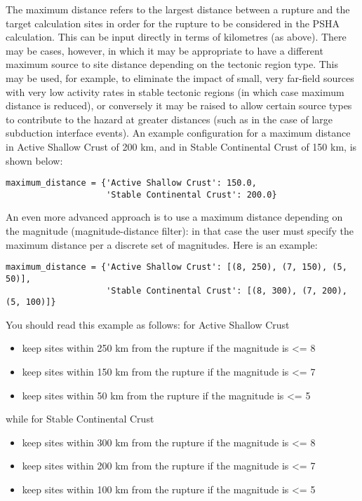 The maximum distance refers to the largest distance between a rupture and the
target calculation sites in order for the rupture to be considered in the PSHA
calculation. This can be input directly in terms of kilometres (as above).
There may be cases, however, in which it may be appropriate to have a
different maximum source to site distance depending on the tectonic region
type. This may be used, for example, to eliminate the impact of small, very
far-field sources with very low activity rates in stable tectonic regions (in
which case maximum distance is reduced), or conversely it may be raised to
allow certain source types to contribute to the hazard at greater distances
(such as in the case of large subduction interface events). An example
configuration for a maximum distance in Active Shallow Crust of 200 km, and in
Stable Continental Crust of 150 km, is shown below:

\begin{verbatim}
maximum_distance = {'Active Shallow Crust': 150.0,
                    'Stable Continental Crust': 200.0}
\end{verbatim}

An even more advanced approach is to use a maximum distance depending on the
magnitude (magnitude-distance filter): in that case the user must specify
the maximum distance per a discrete set of magnitudes. Here is an
example:

\begin{verbatim}
maximum_distance = {'Active Shallow Crust': [(8, 250), (7, 150), (5, 50)],
                    'Stable Continental Crust': [(8, 300), (7, 200), (5, 100)]}
\end{verbatim}

You should read this example as follows: for Active Shallow Crust

\begin{itemize}
\item keep sites within 250 km from the rupture if the magnitude is <= 8
\item keep sites within 150 km from the rupture if the magnitude is <= 7
\item keep sites within 50 km from the rupture if the magnitude is <= 5
\end{itemize}

while for Stable Continental Crust

\begin{itemize}
\item keep sites within 300 km from the rupture if the magnitude is <= 8
\item keep sites within 200 km from the rupture if the magnitude is <= 7
\item keep sites within 100 km from the rupture if the magnitude is <= 5
\end{itemize}

